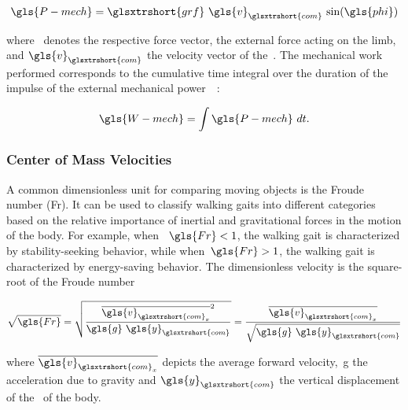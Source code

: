         \begin{align}
            \gls{P-mech} = \glsxtrshort{grf}~\gls{v}_{\glsxtrshort{com}}~\textrm{sin}(\gls{phi})
            \label{eq:mechanical-power}
        \end{align}
        
        where~ denotes the respective force vector, \ie the external force acting on the limb, and$~\gls{v}_{\glsxtrshort{com}}$ the velocity vector of the~. The mechanical work performed corresponds to the cumulative time integral over the duration of the impulse of the external mechanical power~\cite{Donelan2002}~\cite{Lee2011}:
        
        \begin{align}
            \gls{W-mech} = \int \gls{P-mech}~dt.
            \label{eq:mechanical-work}
        \end{align}
        
            \subsubsection{Center of Mass Velocities}
            
            A common dimensionless unit for comparing moving objects is the Froude number (\gls{Fr}). It can be used to classify walking gaits into different categories based on the relative importance of inertial and gravitational forces in the motion of the body. For example, when ~$\gls{Fr} < 1$, the walking gait is characterized by stability-seeking behavior, while when~$\gls{Fr} > 1$, the walking gait is characterized by energy-saving behavior. The dimensionless velocity is the square-root of the Froude number~\cite{Alexander1984}~\cite{Lee2011}

            \begin{align}
                \sqrt{\gls{Fr}} = \sqrt{\frac{\overline{\gls{v}_{\glsxtrshort{com}_x}}^2}{\gls{g}~\gls{y}_{\glsxtrshort{com}}}} = \frac{\overline{\gls{v}_{\glsxtrshort{com}_x}}}{\sqrt{\gls{g}~\gls{y}_{\glsxtrshort{com}}}}
                \label{eq:dimensionless-velocity}
            \end{align}
            
            where $\overline{\gls{v}_{\glsxtrshort{com}_x}}$ depicts the average forward velocity,~\gls{g} the acceleration due to gravity and$~\gls{y}_{\glsxtrshort{com}}$ the vertical displacement of the~ of the body.\\
            
